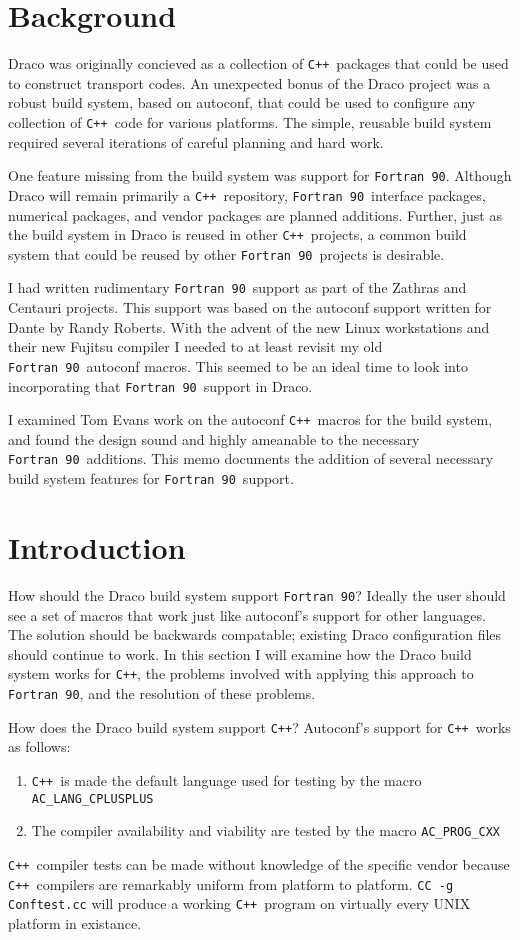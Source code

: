 \documentclass[11pt]{nmemo}
\newcommand{\fninety}{\texttt{Fortran~90}}
\newcommand{\cpp}{\texttt{C++}}
\begin{document}
\section{Background}

Draco was originally concieved as a collection of \cpp\ packages that
could be used to construct transport codes.  An unexpected bonus of
the Draco project was a robust build system, based on autoconf, that
could be used to configure any collection of \cpp\ code for various
platforms.  The simple, reusable build system required several
iterations of careful planning and hard work.

One feature missing from the build system was support for \fninety.
Although Draco will remain primarily a \cpp\ repository, \fninety\
interface packages, numerical packages, and vendor packages are
planned additions.  Further, just as the build system in Draco is
reused in other \cpp\ projects, a common build system that could be
reused by other \fninety\ projects is desirable.

I had written rudimentary \fninety\ support as part of the Zathras and
Centauri projects.  This support was based on the autoconf support
written for Dante by Randy Roberts.  With the advent of the new Linux
workstations and their new Fujitsu compiler I needed to at least
revisit my old \fninety\ autoconf macros.  This seemed to be an ideal
time to look into incorporating that \fninety\ support in Draco.

I examined Tom Evans work on the autoconf \cpp\ macros for the build
system, and found the design sound and highly ameanable to the
necessary \fninety\ additions.  This memo documents the addition of
several necessary build system features for \fninety\ support.

\newpage

\section{Introduction}

How should the Draco build system support \fninety?  Ideally the user
should see a set of macros that work just like autoconf's support for
other languages.  The solution should be backwards compatable;
existing Draco configuration files should continue to work.  In this
section I will examine how the Draco build system works for \cpp, the
problems involved with applying this approach to \fninety, and the
resolution of these problems.

How does the Draco build system support \cpp?  Autoconf's support for
\cpp\ works as follows:
\begin{enumerate} 
\item \cpp\ is made the default language used for testing by the macro
\texttt{AC\_LANG\_CPLUSPLUS}
\item The compiler availability and viability are tested by
the macro \texttt{AC\_PROG\_CXX}
\end{enumerate}
\cpp\ compiler tests can be made without knowledge of the specific
vendor because \cpp\ compilers are remarkably uniform from platform to
platform. \texttt{CC -g Conftest.cc} will produce a working \cpp\
program on virtually every UNIX platform in existance.
\end{document}
